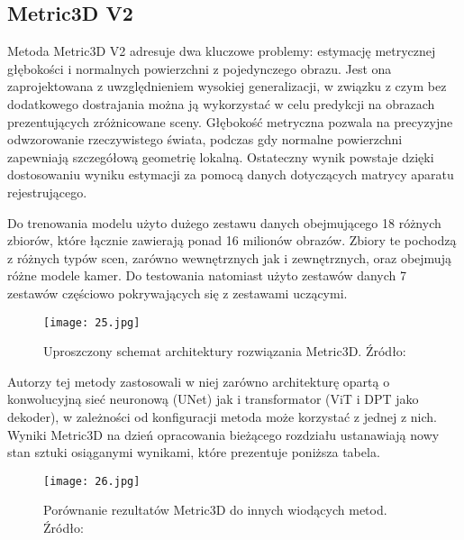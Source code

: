 \subsection{Metric3D V2}
Metoda Metric3D V2 \cite{hu2024} adresuje dwa kluczowe problemy: estymację metrycznej głębokości i normalnych powierzchni z pojedynczego obrazu. Jest ona zaprojektowana z uwzględnieniem wysokiej generalizacji, w związku z czym bez dodatkowego dostrajania można ją wykorzystać w celu predykcji na obrazach prezentujących zróżnicowane sceny.
Głębokość metryczna pozwala na precyzyjne odwzorowanie rzeczywistego świata, podczas gdy normalne powierzchni zapewniają szczegółową geometrię lokalną. Ostateczny wynik powstaje dzięki dostosowaniu wyniku estymacji za pomocą danych dotyczących matrycy aparatu rejestrującego. 

Do trenowania modelu użyto dużego zestawu danych obejmującego 18 różnych zbiorów, które łącznie zawierają ponad 16 milionów obrazów. Zbiory te pochodzą z różnych typów scen, zarówno wewnętrznych jak i zewnętrznych, oraz obejmują różne modele kamer. Do testowania natomiast użyto zestawów danych 7 zestawów częściowo pokrywających się z zestawami uczącymi.

\begin{figure}[H]
    \centering
    \texttt{[image: 25.jpg]}
    \caption{Uproszczony schemat architektury rozwiązania Metric3D. Źródło: \cite{hu2024}}
    \label{fig:metric3d-schema}
\end{figure}

Autorzy tej metody zastosowali w niej zarówno architekturę opartą o konwolucyjną sieć neuronową (UNet) jak i transformator (ViT i DPT jako dekoder), w zależności od konfiguracji metoda może korzystać z jednej z nich. Wyniki Metric3D na dzień opracowania bieżącego rozdziału ustanawiają nowy stan sztuki osiąganymi wynikami, które prezentuje poniższa tabela.
\begin{figure}[H]
    \centering
    \texttt{[image: 26.jpg]}
    \caption{Porównanie rezultatów Metric3D do innych wiodących metod. Źródło: \cite{hu2024}}
    \label{fig:metric3d-results}
\end{figure}

